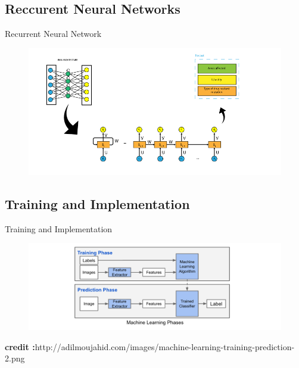\documentclass{beamer}
\begin{document}
\subsection*{Reccurent Neural Networks}
\begin{frame}{Recurrent Neural Network}{}
\begin{figure}[h]
    \centering
    \includegraphics[width=\textwidth]{rnn-2.png}
\end{figure}
\end{frame}

\subsection*{Training and Implementation}



\begin{frame}{Training and Implementation}{}
\begin{figure}[h]
    \centering
    \includegraphics[width=\textwidth]{training.png}
\end{figure}
{\tiny \textbf{credit :}http://adilmoujahid.com/images/machine-learning-training-prediction-2.png \par}
\end{frame}
\end{document}
